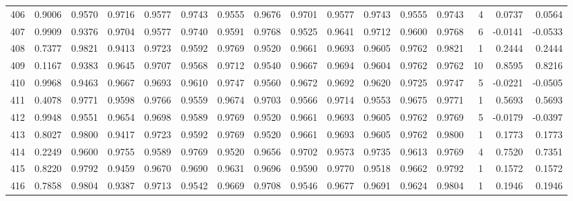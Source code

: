 \begin{tabular}{lrrrrrrrrrrrrrrr}
406 &      0.9006 &  0.9570 &  0.9716 &  0.9577 &  0.9743 &  0.9555 &  0.9676 &  0.9701 &  0.9577 &  0.9743 &   0.9555 &     0.9743 &      4 &                    0.0737 &                     0.0564 \\
407 &      0.9909 &  0.9376 &  0.9704 &  0.9577 &  0.9740 &  0.9591 &  0.9768 &  0.9525 &  0.9641 &  0.9712 &   0.9600 &     0.9768 &      6 &                   -0.0141 &                    -0.0533 \\
408 &      0.7377 &  0.9821 &  0.9413 &  0.9723 &  0.9592 &  0.9769 &  0.9520 &  0.9661 &  0.9693 &  0.9605 &   0.9762 &     0.9821 &      1 &                    0.2444 &                     0.2444 \\
409 &      0.1167 &  0.9383 &  0.9645 &  0.9707 &  0.9568 &  0.9712 &  0.9540 &  0.9667 &  0.9694 &  0.9604 &   0.9762 &     0.9762 &     10 &                    0.8595 &                     0.8216 \\
410 &      0.9968 &  0.9463 &  0.9667 &  0.9693 &  0.9610 &  0.9747 &  0.9560 &  0.9672 &  0.9692 &  0.9620 &   0.9725 &     0.9747 &      5 &                   -0.0221 &                    -0.0505 \\
411 &      0.4078 &  0.9771 &  0.9598 &  0.9766 &  0.9559 &  0.9674 &  0.9703 &  0.9566 &  0.9714 &  0.9553 &   0.9675 &     0.9771 &      1 &                    0.5693 &                     0.5693 \\
412 &      0.9948 &  0.9551 &  0.9654 &  0.9698 &  0.9589 &  0.9769 &  0.9520 &  0.9661 &  0.9693 &  0.9605 &   0.9762 &     0.9769 &      5 &                   -0.0179 &                    -0.0397 \\
413 &      0.8027 &  0.9800 &  0.9417 &  0.9723 &  0.9592 &  0.9769 &  0.9520 &  0.9661 &  0.9693 &  0.9605 &   0.9762 &     0.9800 &      1 &                    0.1773 &                     0.1773 \\
414 &      0.2249 &  0.9600 &  0.9755 &  0.9589 &  0.9769 &  0.9520 &  0.9656 &  0.9702 &  0.9573 &  0.9735 &   0.9613 &     0.9769 &      4 &                    0.7520 &                     0.7351 \\
415 &      0.8220 &  0.9792 &  0.9459 &  0.9670 &  0.9690 &  0.9631 &  0.9696 &  0.9590 &  0.9770 &  0.9518 &   0.9662 &     0.9792 &      1 &                    0.1572 &                     0.1572 \\
416 &      0.7858 &  0.9804 &  0.9387 &  0.9713 &  0.9542 &  0.9669 &  0.9708 &  0.9546 &  0.9677 &  0.9691 &   0.9624 &     0.9804 &      1 &                    0.1946 &                     0.1946 \\

\end{tabular}
